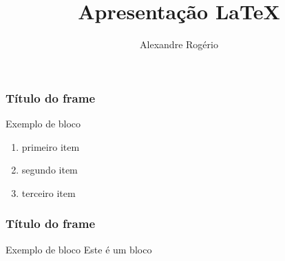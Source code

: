 \documentclass[14pt]{beamer}
\begin{document}
	\author{Alexandre Rogério}
	\title{Apresentação LaTeX}
	\begin{frame}[plain]
		\maketitle
	\end{frame}

	\begin{frame}
		\frametitle{Título do frame}

		\begin{block}{Exemplo de bloco}
			\begin{enumerate}
				\item primeiro item \pause
				\item segundo item \pause 
				\item terceiro item \pause
			\end{enumerate}
		\end{block}
	\end{frame}

	\begin{frame}
		\frametitle{Título do frame}
		\transboxin
		\begin{block}{Exemplo de bloco}
			Este é um bloco
		\end{block}
	\end{frame}

%
%
%
%
%
%
%
%
%
%
%
\end{document}
